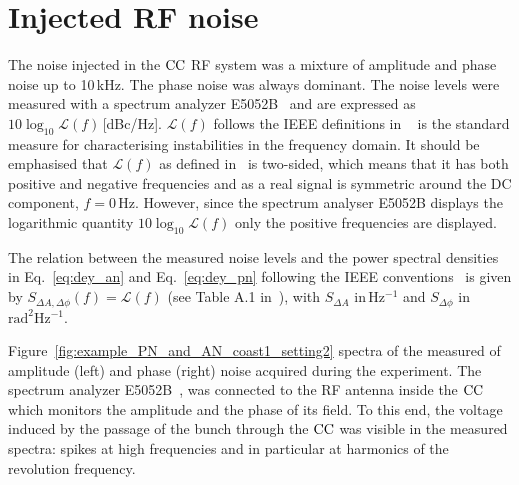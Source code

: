 \section{Injected RF noise}\label{sec:injected_RF_noise}
The noise injected in the ${\mathrm{CC}}$ RF system was a mixture of amplitude and phase noise up to 10\,kHz.
The phase noise was always dominant. The noise levels were measured with a spectrum analyzer E5052B~\cite{E5052B_insight} and are expressed as $10\log_{10}\mathcal{L}(f)$\,[dBc/Hz]. $\mathcal{L}(f)$ follows the IEEE definitions in ~\cite{IEEE:4797525} is the standard measure for characterising instabilities in the frequency domain. It should be emphasised that $\mathcal{L}(f)$ as defined in~\cite{IEEE:4797525} is two-sided, which means that it has both positive and negative frequencies and as a real signal is symmetric around the DC component, $f=0$\,Hz. However, since the spectrum analyser E5052B displays the logarithmic quantity $10\log_{10}\mathcal{L}(f)$ only the positive frequencies are displayed.

The relation between the measured noise levels and the power spectral densities in Eq.~\eqref{eq:dey_an} and Eq.~\eqref{eq:dey_pn} following the IEEE conventions~\cite{IEEE:4797525} is given by $S_{\Delta A, \Delta \phi}(f) = \mathcal{L}(f)$ (see Table A.1 in~\cite{IEEE:4797525}), with $S_{\Delta A}$ in\,Hz$^{-1}$ and $S_{\Delta \phi}$ in $\mathrm{rad^2 Hz^{-1}}$. 

Figure~\ref{fig:example_PN_and_AN_coast1_setting2} spectra of the measured of amplitude (left) and phase (right) noise acquired during the experiment. The spectrum analyzer E5052B~\cite{E5052B_insight},  was connected to the RF antenna inside the ${\mathrm{CC}}$ which monitors the amplitude and the phase of its field. To this end, the voltage induced by the passage of the bunch through the ${\mathrm{CC}}$ was visible in the measured spectra: spikes at high frequencies and in particular at harmonics of the revolution frequency.




